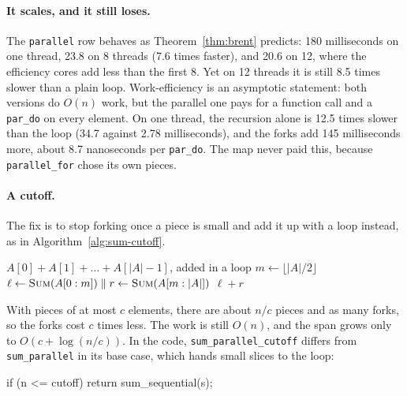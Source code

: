 \paragraph{It scales, and it still loses.} The \texttt{parallel} row behaves as Theorem~\ref{thm:brent} predicts: 180 milliseconds on one thread, 23.8 on 8 threads (7.6 times faster), and 20.6 on 12, where the efficiency cores add less than the first 8. Yet on 12 threads it is still 8.5 times slower than a plain loop. Work-efficiency is an asymptotic statement: both versions do $O(n)$ work, but the parallel one pays for a function call and a \texttt{par\_do} on every element. On one thread, the recursion alone is 12.5 times slower than the loop (34.7 against 2.78 milliseconds), and the forks add 145 milliseconds more, about 8.7 nanoseconds per \texttt{par\_do}. The map never paid this, because \texttt{parallel\_for} chose its own pieces.

\paragraph{A cutoff.} The fix is to stop forking once a piece is small and add it up with a loop instead, as in Algorithm~\ref{alg:sum-cutoff}.

\begin{algorithm}[H]
  \caption{Sum with a cutoff $c$}
  \label{alg:sum-cutoff}
  \begin{algorithmic}
        \State \Return $A[0] + A[1] + \dots + A[|A| - 1]$, added in a loop
      \EndIf
      \State $m \gets \lfloor |A| / 2 \rfloor$
      \State $\ell \gets \Call{Sum}{A[0 : m]} \parallel r \gets \Call{Sum}{A[m : |A|]}$
      \State \Return $\ell + r$
    \EndFunction
  \end{algorithmic}
\end{algorithm}

With pieces of at most $c$ elements, there are about $n/c$ pieces and as many forks, so the forks cost $c$ times less. The work is still $O(n)$, and the span grows only to $O(c + \log(n/c))$. In the code, \texttt{sum\_parallel\_cutoff} differs from \texttt{sum\_parallel} in its base case, which hands small slices to the loop:
\begin{code}
if (n <= cutoff) return sum_sequential(s);
\end{code}

